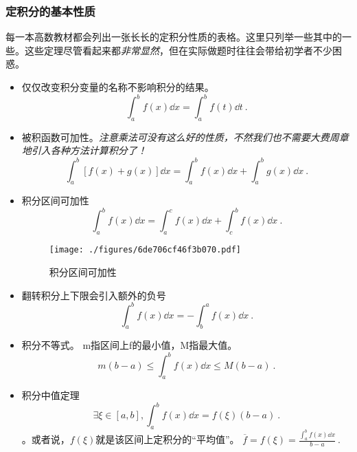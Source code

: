 \subsubsection{定积分的基本性质}
每一本高数教材\cite{同济高}\cite{Thomas}都会列出一张长长的定积分性质的表格。这里只列举一些其中的一些。这些定理尽管看起来都\textsl{非常显然}，但在实际做题时往往会带给初学者不少困惑。
\begin{itemize}
\item 仅仅改变积分变量的名称不影响积分的结果。
$$\int^b_a f(x) \dd x = \int^b_a f(t) \dd t~.$$
\item 被积函数可加性。\textsl{注意乘法可没有这么好的性质，不然我们也不需要大费周章地引入各种方法计算积分了！}
$$\int^b_a [f(x)+g(x)] \dd x = \int^b_a f(x)\dd x + \int^b_a g(x)\dd x~.$$
\item 积分区间可加性
$$\int^b_a f(x) \dd x = \int^c_a f(x) \dd x  + \int^b_c f(x) \dd x ~.$$
\begin{figure}[ht]
\centering
\texttt{[image: ./figures/6de706cf46f3b070.pdf]}
\caption{积分区间可加性} \label{fig_DefInt_5}
\end{figure}
\item 翻转积分上下限会引入额外的负号 %
$$\int^b_a f(x) \dd x = -\int^a_b f(x) \dd x~.$$
\item 积分不等式。 m指区间上f的最小值，M指最大值。
$$m(b-a)\le\int^b_a f(x) \dd x \le M(b-a)~.$$
\item 积分中值定理
$$\exists \xi \in [a,b], \int^b_a f(x) \dd x = f(\xi)(b-a)~.$$。或者说，$f(\xi)$就是该区间上定积分的“平均值”。 $ \overline f= f(\xi)=\frac{\int^b_a f(x) \dd x}{b-a}~.$
\end{itemize}

